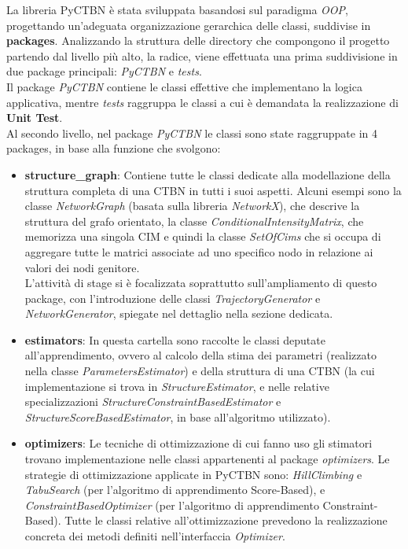   La libreria PyCTBN è stata sviluppata basandosi sul paradigma \textit{OOP}, progettando un'adeguata
  organizzazione gerarchica delle classi, suddivise in \textbf{packages}.
  Analizzando la struttura delle directory che compongono il progetto partendo dal livello più alto, 
  la radice, viene effettuata una prima suddivisione in due package principali: \textit{PyCTBN} e
  \textit{tests}.\\
  Il package \textit{PyCTBN} contiene le classi effettive che implementano la logica applicativa,
  mentre \textit{tests} raggruppa le classi a cui è demandata la realizzazione di \textbf{Unit Test}.\\
  Al secondo livello, nel package \textit{PyCTBN} le classi sono state raggruppate in 4 packages, 
  in base alla funzione che svolgono:
  
  \begin{itemize}
    \item \textbf{structure\_graph}: Contiene tutte le classi dedicate alla modellazione della struttura completa di una
      CTBN in tutti i suoi aspetti. Alcuni esempi sono la classe \textit{NetworkGraph} (basata sulla libreria \textit{NetworkX}),
      che descrive la struttura del grafo orientato, la classe \textit{ConditionalIntensityMatrix}, che
      memorizza una singola CIM e quindi la classe \textit{SetOfCims} che si occupa di aggregare
      tutte le matrici associate ad uno specifico nodo in relazione ai valori dei nodi genitore.\\
      L'attività di stage si è focalizzata soprattutto sull'ampliamento di questo package, con
      l'introduzione delle classi \textit{TrajectoryGenerator} e \textit{NetworkGenerator}, spiegate nel
      dettaglio nella sezione dedicata.
      
    \item \textbf{estimators}: In questa cartella sono raccolte le classi deputate all'apprendimento,
      ovvero al calcolo della stima dei parametri (realizzato nella classe \textit{ParametersEstimator}) e della struttura di una CTBN
      (la cui implementazione si trova in \textit{StructureEstimator}, e nelle relative specializzazioni \textit{StructureConstraintBasedEstimator} e
      \textit{StructureScoreBasedEstimator}, in base all'algoritmo utilizzato).

    \item \textbf{optimizers}: Le tecniche di ottimizzazione di cui fanno uso gli stimatori trovano
      implementazione nelle classi appartenenti al package \textit{optimizers}. 
      Le strategie di ottimizzazione applicate in PyCTBN sono: \textit{HillClimbing} e \textit{TabuSearch} (per l'algoritmo di apprendimento Score-Based),
      e \textit{ConstraintBasedOptimizer} (per l'algoritmo di apprendimento Constraint-Based). 
      Tutte le classi relative all'ottimizzazione prevedono la realizzazione concreta dei metodi definiti nell'interfaccia \textit{Optimizer}.
    

\end{itemize}
